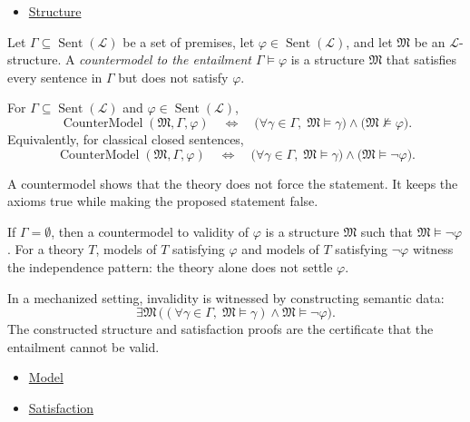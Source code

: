 \begin{dependencies}
\begin{itemize}
  \item \hyperref[def:axiom-systems-structure]{Structure}
\end{itemize}
\end{dependencies}

\begin{definition}[Countermodel]
\label{def:axiom-systems-countermodel}
Let $\Gamma\subseteq\operatorname{Sent}(\mathcal{L})$ be a set of premises,
let $\varphi\in\operatorname{Sent}(\mathcal{L})$, and let $\mathfrak{M}$ be
an $\mathcal{L}$-structure. A \emph{countermodel to the entailment
$\Gamma\vDash\varphi$} is a structure $\mathfrak{M}$ that satisfies every
sentence in $\Gamma$ but does not satisfy $\varphi$.
\end{definition}

\begin{remark*}
For $\Gamma\subseteq\operatorname{Sent}(\mathcal{L})$ and
$\varphi\in\operatorname{Sent}(\mathcal{L})$,
\[
  \operatorname{CounterModel}(\mathfrak{M},\Gamma,\varphi)
  \quad\Longleftrightarrow\quad
  \bigl(\forall \gamma\in\Gamma,\; \mathfrak{M}\vDash\gamma\bigr)
  \land
  \bigl(\mathfrak{M}\not\vDash\varphi\bigr).
\]
Equivalently, for classical closed sentences,
\[
  \operatorname{CounterModel}(\mathfrak{M},\Gamma,\varphi)
  \quad\Longleftrightarrow\quad
  \bigl(\forall \gamma\in\Gamma,\; \mathfrak{M}\vDash\gamma\bigr)
  \land
  \bigl(\mathfrak{M}\vDash\neg\varphi\bigr).
\]
\end{remark*}

\begin{remark*}[Interpretation]
A countermodel shows that the theory does not force the statement. It keeps
the axioms true while making the proposed statement false.
\end{remark*}

\begin{remark*}
If $\Gamma=\emptyset$, then a countermodel to validity of $\varphi$ is a
structure $\mathfrak{M}$ such that $\mathfrak{M}\vDash\neg\varphi$. For a
theory $T$, models of $T$ satisfying $\varphi$ and models of $T$ satisfying
$\neg\varphi$ witness the independence pattern: the theory alone does not
settle $\varphi$.
\end{remark*}

\begin{remark*}
In a mechanized setting, invalidity is witnessed by constructing semantic
data:
\[
  \exists\mathfrak{M}\,
  \bigl((\forall\gamma\in\Gamma,\;\mathfrak{M}\vDash\gamma)
  \land
  \mathfrak{M}\vDash\neg\varphi\bigr).
\]
The constructed structure and satisfaction proofs are the certificate that the
entailment cannot be valid.
\end{remark*}

\begin{dependencies}
\begin{itemize}
  \item \hyperref[def:axiom-systems-model]{Model}
  \item \hyperref[def:axiom-systems-satisfaction]{Satisfaction}
\end{itemize}
\end{dependencies}
